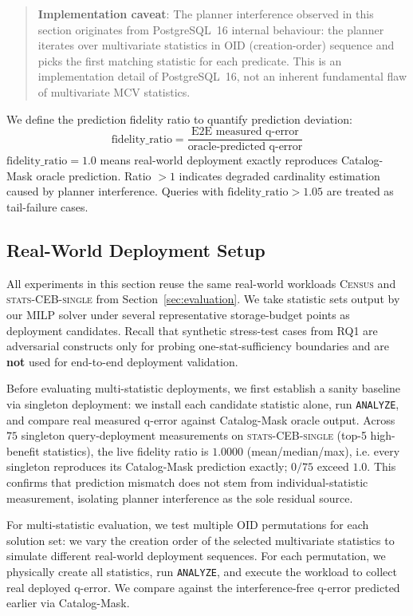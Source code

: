 \documentclass[sigconf, nonacm]{acmart}
\begin{document}
\begin{quote}
\noindent\textbf{Implementation caveat}:
The planner interference observed in this section originates from PostgreSQL~16 internal behaviour: the planner iterates over multivariate statistics in OID (creation-order) sequence and picks the first matching statistic for each predicate.
This is an implementation detail of PostgreSQL~16, not an inherent fundamental flaw of multivariate MCV statistics. 
\label{sec:switch}
\end{quote}

We define the prediction fidelity ratio to quantify prediction deviation:
\[
\text{fidelity\_ratio} = \frac{\text{E2E measured q-error}}{\text{oracle-predicted q-error}}
\]
$\text{fidelity\_ratio}=1.0$ means real-world deployment exactly reproduces Catalog-Mask oracle prediction. Ratio $>1$ indicates degraded cardinality estimation caused by planner interference. Queries with $\text{fidelity\_ratio}>1.05$ are treated as tail-failure cases.

\subsection{Real-World Deployment Setup}
\label{sec:deploy_setup}

All experiments in this section reuse the same real-world workloads \textsc{Census} and \textsc{stats-CEB-single} from Section~\ref{sec:evaluation}.
We take statistic sets output by our MILP solver under several representative storage-budget points as deployment candidates.
Recall that synthetic stress-test cases from RQ1 are adversarial constructs only for probing one-stat-sufficiency boundaries and are \textbf{not} used for end-to-end deployment validation.

Before evaluating multi-statistic deployments, we first establish a sanity baseline via singleton deployment: we install each candidate statistic alone, run \texttt{ANALYZE}, and compare real measured q-error against Catalog-Mask oracle output.
Across $75$ singleton query-deployment measurements on \textsc{stats-CEB-single} (top-5 high-benefit statistics), the live fidelity ratio is $1.0000$ (mean/median/max), i.e. every singleton reproduces its Catalog-Mask prediction exactly; $0/75$ exceed $1.0$.
This confirms that prediction mismatch does not stem from individual-statistic measurement, isolating planner interference as the sole residual source.

For multi-statistic evaluation, we test multiple OID permutations for each solution set: we vary the creation order of the selected multivariate statistics to simulate different real-world deployment sequences.
For each permutation, we physically create all statistics, run \texttt{ANALYZE}, and execute the workload to collect real deployed q-error. We compare against the interference-free q-error predicted earlier via Catalog-Mask.
\end{document}
